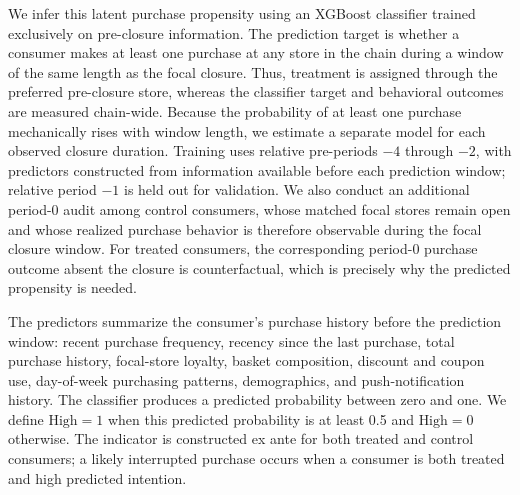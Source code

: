 \documentclass[11 pt]{article}
\begin{document}
We infer this latent purchase propensity using an XGBoost classifier trained exclusively on pre-closure information. The prediction target is whether a consumer makes at least one purchase at any store in the chain during a window of the same length as the focal closure. Thus, treatment is assigned through the preferred pre-closure store, whereas the classifier target and behavioral outcomes are measured chain-wide. Because the probability of at least one purchase mechanically rises with window length, we estimate a separate model for each observed closure duration. Training uses relative pre-periods $-4$ through $-2$, with predictors constructed from information available before each prediction window; relative period $-1$ is held out for validation. We also conduct an additional period-0 audit among control consumers, whose matched focal stores remain open and whose realized purchase behavior is therefore observable during the focal closure window. For treated consumers, the corresponding period-0 purchase outcome absent the closure is counterfactual, which is precisely why the predicted propensity is needed.

The predictors summarize the consumer's purchase history before the prediction window: recent purchase frequency, recency since the last purchase, total purchase history, focal-store loyalty, basket composition, discount and coupon use, day-of-week purchasing patterns, demographics, and push-notification history. The classifier produces a predicted probability between zero and one. We define $\text{High}=1$ when this predicted probability is at least 0.5 and $\text{High}=0$ otherwise. The indicator is constructed ex ante for both treated and control consumers; a likely interrupted purchase occurs when a consumer is both treated and high predicted intention.
\end{document}
